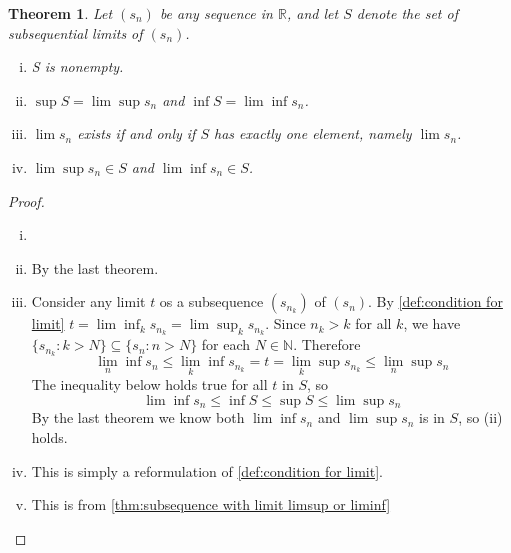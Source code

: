 \documentclass[12pt, lettersize]{book}
\theoremstyle{plain}
\newtheorem{thm}{Theorem}[section]
\theoremstyle{definition}
\theoremstyle{remark}
\begin{document}
		\begin{thm}\label{def:subsequential limit condition}
		Let $(s_n)$ be any sequence in $\mathbb{R}$, and let $S$ denote the set of subsequential limits of $(s_n)$.
		\begin{enumerate}[(i)]
			\item S is nonempty.
			\item $\sup S=\lim\sup s_n$ and $\inf S=\lim\inf s_n$.
			\item $\lim s_n$ exists if and only if $S$ has exactly one element, namely $\lim s_n$.
			\item $\lim\sup s_n\in S$ and $\lim\inf s_n\in S$.
		\end{enumerate}
		\end{thm}
		\begin{proof}
		\begin{enumerate}[(i)]
			\item[] 
			\item By the last theorem.
			\item Consider any limit $t$ os a subsequence $(s_{n_k})$ of $(s_n)$. By \ref{def:condition for limit} $t=\lim\inf_ks_{n_k}=\lim\sup_ks_{n_k}$. Since $n_k>k$ for all $k$, we have $\{s_{n_k}: k>N\}\subseteq\{s_n: n>N\}$ for each $N\in\mathbb{N}$. Therefore
			\begin{displaymath}
				\lim\limits_{n}\inf s_n\leq\lim\limits_{k}\inf s_{n_k}=t=\lim\limits_{k}\sup s_{n_k}\leq	\lim\limits_{n}\sup s_n
			\end{displaymath}
			The inequality below holds true for all $t$ in $S$, so
			\begin{displaymath}
				\lim\inf s_n\leq\inf S\leq\sup S\leq\lim\sup s_n
			\end{displaymath}
			By the last theorem we know both $\lim\inf s_n$ and $\lim\sup s_n$ is in $S$, so (ii) holds.
			\item This is simply a reformulation of \ref{def:condition for limit}.
			\item This is from \ref{thm:subsequence with limit limsup or liminf}
		\end{enumerate}
		\end{proof}
		
\end{document}
